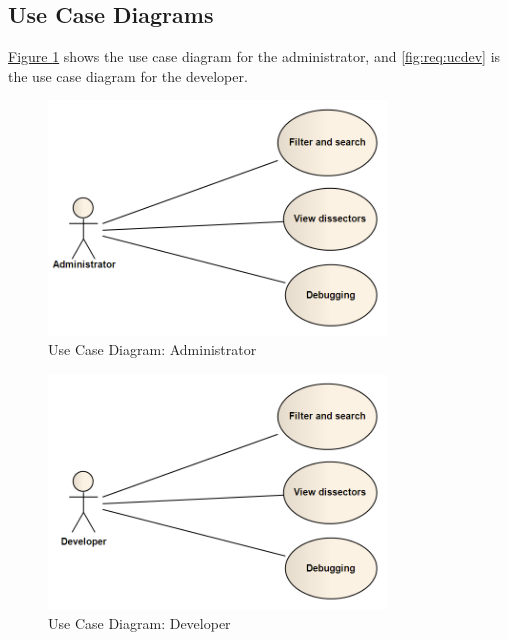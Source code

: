 \subsection{Use Case Diagrams}
\hyperref[fig:req:ucadm]{Figure \ref*{fig:req:ucadm}} shows the use case
diagram for the administrator, and \autoref{fig:req:ucdev} is the use case
diagram for the developer.
\begin{figure}[htbp]
	\center
	\includegraphics[width=0.8\textwidth]{./planning/img/administrator}
	\caption{Use Case Diagram: Administrator\label{fig:req:ucadm}}
\end{figure}

\begin{figure}[htbp]
	\center
	\includegraphics[width=0.8\textwidth]{./planning/img/developer}
	\caption{Use Case Diagram: Developer\label{fig:req:ucdev}}
\end{figure}


